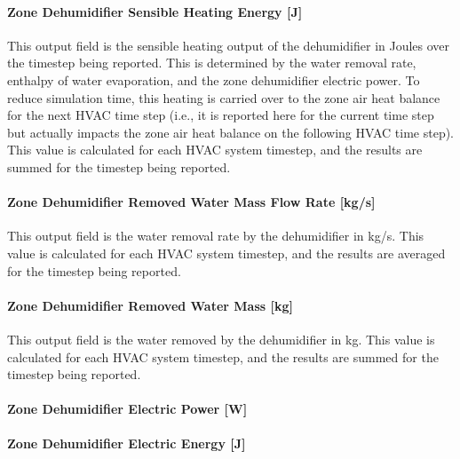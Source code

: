 \paragraph{Zone Dehumidifier Sensible Heating Energy {[}J{]}}\label{zone-dehumidifier-sensible-heating-energy-j}

This output field is the sensible heating output of the dehumidifier in Joules over the timestep being reported. This is determined by the water removal rate, enthalpy of water evaporation, and the zone dehumidifier electric power. To reduce simulation time, this heating is carried over to the zone air heat balance for the next HVAC time step (i.e., it is reported here for the current time step but actually impacts the zone air heat balance on the following HVAC time step). This value is calculated for each HVAC system timestep, and the results are summed for the timestep being reported.

\paragraph{Zone Dehumidifier Removed Water Mass Flow Rate {[}kg/s{]}}\label{zone-dehumidifier-removed-water-mass-flow-rate-kgs}

This output field is the water removal rate by the dehumidifier in kg/s. This value is calculated for each HVAC system timestep, and the results are averaged for the timestep being reported.

\paragraph{Zone Dehumidifier Removed Water Mass {[}kg{]}}\label{zone-dehumidifier-removed-water-mass-kg}

This output field is the water removed by the dehumidifier in kg. This value is calculated for each HVAC system timestep, and the results are summed for the timestep being reported.

\paragraph{Zone Dehumidifier Electric Power {[}W{]}}\label{zone-dehumidifier-electric-power-w}

\paragraph{Zone Dehumidifier Electric Energy {[}J{]}}\label{zone-dehumidifier-electric-energy-j}

